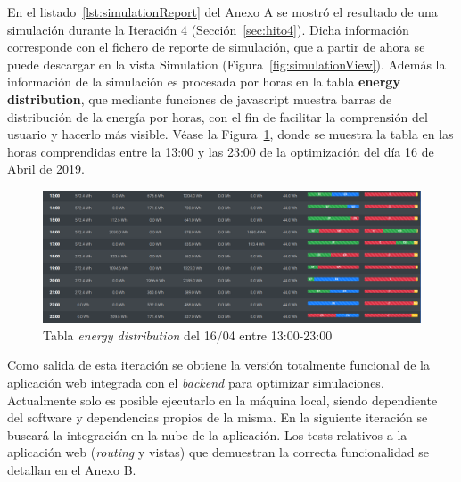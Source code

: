En el listado~\ref{lst:simulationReport} del Anexo A se mostró el resultado de una simulación durante la Iteración 4 (Sección~\ref{sec:hito4}). Dicha información corresponde con el fichero de reporte de simulación, que a partir de ahora se puede descargar en la vista Simulation (Figura~\ref{fig:simulationView}). Además la información de la simulación es procesada por horas en la tabla \textbf{energy distribution}, que mediante funciones de javascript muestra barras de distribución de la energía por horas, con el fin de facilitar la comprensión del usuario y hacerlo más visible. Véase la Figura~\ref{fig:energyDistrib}, donde se muestra la tabla en las horas comprendidas entre la 13:00 y las 23:00 de la optimización del día 16 de Abril de 2019.
\begin{figure}[H]
            \centering
            \includegraphics[width=17cm]{figs/energy_distrib.png}
            \caption{Tabla \textit{energy distribution} del 16/04 entre 13:00-23:00}
            \label{fig:energyDistrib}
\end{figure}


Como salida de esta iteración se obtiene la versión totalmente funcional de la aplicación web integrada con el \textit{backend} para optimizar simulaciones. Actualmente solo es posible ejecutarlo en la máquina local, siendo dependiente del software y dependencias propios de la misma. En la siguiente iteración se buscará la integración en la nube de la aplicación. Los tests relativos a la aplicación web (\textit{routing} y vistas) que demuestran la correcta funcionalidad se detallan en el Anexo B.
